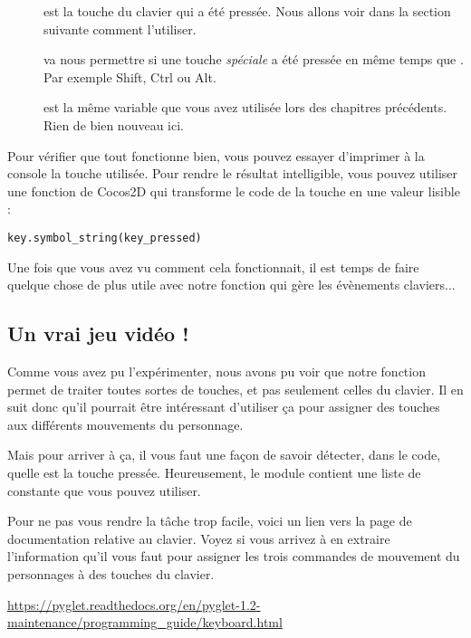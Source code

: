 \begin{description}
\item[] est la touche du clavier qui a été pressée. Nous allons voir dans la section suivante comment l'utiliser.
\item[] va nous permettre si une touche \emph{spéciale} a été pressée en même temps que . Par exemple Shift, Ctrl ou Alt.
\item[] est la même variable  que vous avez utilisée lors des chapitres précédents. Rien de bien nouveau ici.
\end{description}

Pour vérifier que tout fonctionne bien, vous pouvez essayer d'imprimer à la console la touche utilisée. Pour rendre le résultat intelligible, vous pouvez utiliser une fonction de Cocos2D qui transforme le code de la touche en une valeur lisible :

\begin{lstlisting}
key.symbol_string(key_pressed)
\end{lstlisting}

Une fois que vous avez vu comment cela fonctionnait, il est temps de faire quelque chose de plus utile avec notre fonction qui gère les évènements claviers...

\subsection{Un vrai jeu vidéo !}

Comme vous avez pu l'expérimenter, nous avons pu voir que notre fonction  permet de traiter toutes sortes de touches, et pas seulement celles du clavier. Il en suit donc qu'il pourrait être intéressant d'utiliser ça pour assigner des touches aux différents mouvements du personnage.

Mais pour arriver à ça, il vous faut une façon de savoir détecter, dans le code, quelle est la touche pressée. Heureusement, le module  contient une liste de constante que vous pouvez utiliser.

Pour ne pas vous rendre la tâche trop facile, voici un lien vers la page de documentation relative au clavier. Voyez si vous arrivez à en extraire l'information qu'il vous faut pour assigner les trois commandes de mouvement du personnages à des touches du clavier.

\url{https://pyglet.readthedocs.org/en/pyglet-1.2-maintenance/programming_guide/keyboard.html}

